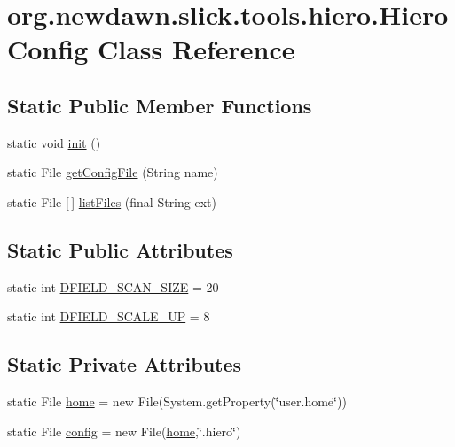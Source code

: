 \hypertarget{classorg_1_1newdawn_1_1slick_1_1tools_1_1hiero_1_1_hiero_config}{}\section{org.\+newdawn.\+slick.\+tools.\+hiero.\+Hiero\+Config Class Reference}
\label{classorg_1_1newdawn_1_1slick_1_1tools_1_1hiero_1_1_hiero_config}
\subsection*{Static Public Member Functions}
\begin{DoxyCompactItemize}
\item 
static void \mbox{\hyperlink{classorg_1_1newdawn_1_1slick_1_1tools_1_1hiero_1_1_hiero_config_a2c29572e725d71d622efa31e2c4b0766}{init}} ()
\item 
static File \mbox{\hyperlink{classorg_1_1newdawn_1_1slick_1_1tools_1_1hiero_1_1_hiero_config_a4e8988e2077081022054edc66ff494f0}{get\+Config\+File}} (String name)
\item 
static File \mbox{[}$\,$\mbox{]} \mbox{\hyperlink{classorg_1_1newdawn_1_1slick_1_1tools_1_1hiero_1_1_hiero_config_aa9c460f993b805e30a1bcca2eb12c2b0}{list\+Files}} (final String ext)
\end{DoxyCompactItemize}
\subsection*{Static Public Attributes}
\begin{DoxyCompactItemize}
\item 
static int \mbox{\hyperlink{classorg_1_1newdawn_1_1slick_1_1tools_1_1hiero_1_1_hiero_config_ae5bde1ec384e1d9d5fbbbf0096e644e5}{D\+F\+I\+E\+L\+D\+\_\+\+S\+C\+A\+N\+\_\+\+S\+I\+ZE}} = 20
\item 
static int \mbox{\hyperlink{classorg_1_1newdawn_1_1slick_1_1tools_1_1hiero_1_1_hiero_config_ac8136db71e5e7677b44c8980eab003d6}{D\+F\+I\+E\+L\+D\+\_\+\+S\+C\+A\+L\+E\+\_\+\+UP}} = 8
\end{DoxyCompactItemize}
\subsection*{Static Private Attributes}
\begin{DoxyCompactItemize}
\item 
static File \mbox{\hyperlink{classorg_1_1newdawn_1_1slick_1_1tools_1_1hiero_1_1_hiero_config_a381768b9b45f39c0aa7e86f7d12ed000}{home}} = new File(System.\+get\+Property(\char`\"{}user.\+home\char`\"{}))
\item 
static File \mbox{\hyperlink{classorg_1_1newdawn_1_1slick_1_1tools_1_1hiero_1_1_hiero_config_a13063195c209bdd37f19d27a938cc508}{config}} = new File(\mbox{\hyperlink{classorg_1_1newdawn_1_1slick_1_1tools_1_1hiero_1_1_hiero_config_a381768b9b45f39c0aa7e86f7d12ed000}{home}},\char`\"{}.hiero\char`\"{})
\end{DoxyCompactItemize}


